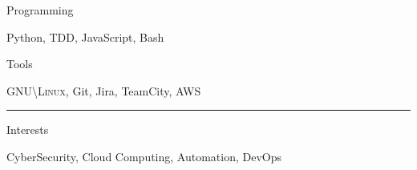 \documentclass[a4paper,10pt]{article}
\newlength{\cvcolumngapwidth}
\newlength{\cvleftcolumnwidth}
\newlength{\cvrightcolumnwidth}
\newcommand{\cvsectionstyle}[1]{{\normalsize\cvsectionfont\textcolor{cvsectioncolor}{#1}}}
\newcommand{\cvheadingstyle}[1]{{\normalsize\cvheadingfont\textcolor{cvheadingcolor}{#1}}}
\newlength{\cvafteritemskipamount}
\newlength{\cvaftersectionskipamount}
\newlength{\cvbetweensectionandheadingextraskipamount}
\newlength{\cvparskip}
\newcommand{\cvsection}[1]{
    \begin{minipage}[t]{\cvleftcolumnwidth}
        \raggedleft\cvsectionstyle{#1}
    \end{minipage}%
    \hspace{\cvcolumngapwidth}%
    \begin{minipage}[t]{\cvrightcolumnwidth}
        \textcolor{cvrulecolor}{\rule{\cvrightcolumnwidth}{0.3mm}}
    \end{minipage}

    \vspace{\cvaftersectionskipamount}
}
\newcommand{\cvitem}[2]{
    \begin{minipage}[t]{\cvleftcolumnwidth}
        \raggedleft #1
    \end{minipage}%
    \hspace{\cvcolumngapwidth}%
    \begin{minipage}[t]{\cvrightcolumnwidth}
        \setlength{\parskip}{\cvparskip} #2
    \end{minipage}

    \vspace{\cvafteritemskipamount}
}
\begin{document}
\cvitem{
    \cvheadingstyle{Programming}
}{
    \vspace{-3mm}
    Python, TDD, JavaScript, Bash
    \vspace{-3mm}
}
\cvitem{
    \cvheadingstyle{Tools}
}{
    \vspace{-3mm}
    \textsc{GNU\textbackslash Linux}, Git, Jira, TeamCity, AWS
    \vspace{-3mm}
}


\cvsection{ADDITIONAL INFORMATION}

\vspace{\cvbetweensectionandheadingextraskipamount}

\cvitem{
    \cvheadingstyle{Interests}
}{
    CyberSecurity, Cloud Computing, Automation, DevOps
}
\end{document}
